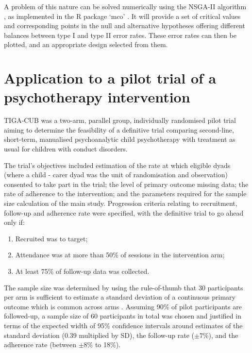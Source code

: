 \documentclass[AMA,STIX1COL]{WileyNJD-v2}
\begin{document}
A problem of this nature can be solved numerically using the NSGA-II algorithm \cite{Deb2002}, as implemented in the R package `mco' \cite{Mersmann2014}. It will provide a set of critical values and corresponding points in the null and alternative hypotheses offering different balances between type I and type II error rates. These error rates can then be plotted, and an appropriate design selected from them.

\section{Application to a pilot trial of a psychotherapy intervention}

TIGA-CUB was a two-arm, parallel group, individually randomised pilot trial aiming to determine the feasibility of a definitive trial comparing second-line, short-term, manualised psychoanalytic child psychotherapy with treatment as usual for children with conduct disorders. 

The trial's objectives included estimation of the rate at which eligible dyads (where a child - carer dyad was the unit of randomisation and observation) consented to take part in the trial; the level of primary outcome missing data; the rate of adherence to the intervention; and the parameters required for the sample size calculation of the main study. 	Progression criteria relating to recruitment, follow-up and adherence rate were specified, with the definitive trial to go ahead only if:
\begin{enumerate}
\item Recruited was to target;
\item Attendance was at more than 50\% of sessions in the intervention arm;
\item At least 75\% of follow-up data was collected.
\end{enumerate}

The sample size was determined by using the rule-of-thumb that 30 participants per arm is sufficient to estimate a standard deviation of a continuous primary outcome which is common across arms \cite{Lancaster2004}. Assuming 90\% of pilot participants are followed-up, a sample size of 60 participants in total was chosen and justified in terms of the expected width of 95\% confidence intervals around estimates of the standard deviation (0.39 multiplied by SD), the follow-up rate ($\pm 7$\%), and the adherence rate (between $\pm 8$\% to 18\%).
\end{document}
